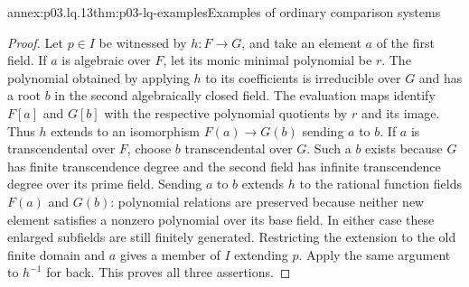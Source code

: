 \begin{annexitem}{annex:p03.lq.13}{thm:p03-lq-examples}{Examples of ordinary comparison systems}
\begin{proof}
Let \(p\in I\) be witnessed by \(h:F\to G\), and take an element
\(a\) of the first field. If \(a\) is algebraic over \(F\),
let its monic minimal polynomial be \(r\). The polynomial obtained
by applying \(h\) to its coefficients is irreducible over \(G\)
and has a root \(b\) in the second algebraically closed field.
The evaluation maps identify \(F[a]\) and \(G[b]\) with the
respective polynomial quotients by \(r\) and its image. Thus
\(h\) extends to an isomorphism \(F(a)\to G(b)\) sending
\(a\) to \(b\).
If \(a\) is transcendental over \(F\), choose \(b\)
transcendental over \(G\). Such a \(b\) exists because \(G\)
has finite transcendence degree and the second field has infinite
transcendence degree over its prime field. Sending \(a\) to
\(b\) extends \(h\) to the rational function fields \(F(a)\)
and \(G(b)\): polynomial relations are preserved because neither
new element satisfies a nonzero polynomial over its base field.
In either case these enlarged subfields are still finitely
generated. Restricting the extension to the old finite domain
and \(a\) gives a member of \(I\) extending \(p\).
Apply the same argument to \(h^{-1}\) for back. This proves
all three assertions.
\end{proof}
\end{annexitem}


